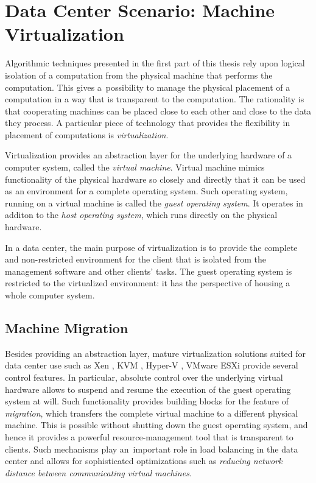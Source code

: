 \section{Data Center Scenario: Machine Virtualization}
\label{sec:intro-machine-virtualization}

Algorithmic techniques presented in the first part of this thesis rely upon logical isolation of a computation from the physical machine that performs the computation.
This gives a~possibility to manage the physical placement of a computation in a way that is transparent to the computation.
The rationality is that cooperating machines can be placed close to each other and close to the data they process.
A particular piece of technology that provides the flexibility in placement of computations is \emph{virtualization}.

Virtualization provides an abstraction layer for the underlying hardware of a computer system, called the \emph{virtual machine}.
Virtual machine mimics functionality of the physical hardware so closely and
directly that it can be used as an environment for a complete operating system.
Such operating system, running on a virtual machine is called the \emph{guest
operating system}. It operates in additon to the \emph{host operating
system}, which runs directly on the physical hardware. 

In a data center, the main purpose of virtualization is to provide the complete and non-restricted environment for the client that is isolated from the management software and other clients' tasks.
The guest operating system is restricted to the virtualized environment: it has the perspective of housing a whole computer system.


\subsection{Machine Migration}

Besides providing an abstraction layer, mature virtualization solutions suited for data center use such as Xen
\cite{url-xen}, KVM \cite{url-kvm}, Hyper-V \cite{url-hyperv}, VMware ESXi
\cite{url-vmware} provide several control features.
In particular, absolute control over the underlying virtual hardware allows to suspend and resume the execution of the guest operating system at will.
Such functionality provides building blocks for the feature of \emph{migration}, which transfers the complete virtual machine to a different physical machine.
This is possible without shutting down the guest operating system, and hence it provides a powerful resource-management tool that is transparent to clients.
Such mechanisms play an~important role in load balancing in the data center and allows for sophisticated optimizations such as \emph{reducing network distance between communicating virtual machines}.

